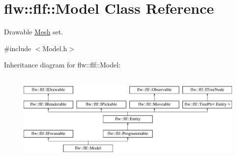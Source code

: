 \hypertarget{classflw_1_1flf_1_1Model}{}\section{flw\+:\+:flf\+:\+:Model Class Reference}
\label{classflw_1_1flf_1_1Model}


Drawable \hyperlink{classflw_1_1flf_1_1Mesh}{Mesh} set.  




{\ttfamily \#include $<$Model.\+h$>$}

Inheritance diagram for flw\+:\+:flf\+:\+:Model\+:\begin{figure}[H]
\begin{center}
\leavevmode
\includegraphics[height=4.487180cm]{classflw_1_1flf_1_1Model}
\end{center}
\end{figure}
